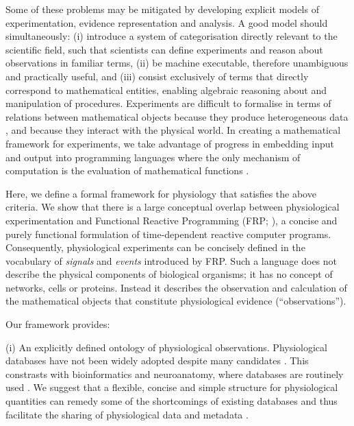 Some of these problems may be mitigated by developing explicit models
of experimentation, evidence representation and analysis. A good model
should simultaneously: (i) introduce a system of categorisation
directly relevant to the scientific field, such that scientists can
define experiments and reason about observations in familiar terms,
(ii) be machine executable, therefore unambiguous and practically
useful, and (iii) consist exclusively of terms that directly
correspond to mathematical entities, enabling algebraic reasoning
about and manipulation of procedures.  Experiments are difficult to
formalise in terms of relations between mathematical objects because
they produce heterogeneous data \citep{Tukey1962}, and because they
interact with the physical world. In creating a mathematical framework
for experiments, we take advantage of progress in embedding input and
output \citep{PeytonJones2002, Wadler1995} into programming languages
where the only mechanism of computation is the evaluation of
mathematical functions \citep{Church1941}.

Here, we define a formal framework for physiology
that satisfies the above criteria. We show that there
is a large conceptual overlap between physiological experimentation
and Functional Reactive Programming (FRP; \citep{Elliott1997,
  Nilsson2002}), a concise and purely functional formulation of
time-dependent reactive computer programs. Consequently, physiological
experiments can be concisely defined in the vocabulary of
\emph{signals} and \emph{events} introduced by FRP. Such a language
does not describe the physical components of biological organisms; it
has no concept of networks, cells or proteins. Instead it describes
the observation and calculation of the mathematical objects that
constitute physiological evidence (``observations'').

Our framework provides:

(i) An explicitly defined ontology of physiological
observations. Physiological databases have not been widely adopted
\citep{Herz2008, Amari2002} despite many candidates \citep{Jessop2010,
  Teeters2008, Frishkoff2009, Katz2010}.  This constrasts with
bioinformatics and neuroanatomy, where databases are routinely used
\citep{Rodriguez-Tome1996, Ascoli2007}. We suggest that a flexible,
concise and simple structure for physiological quantities can remedy
some of the shortcomings \citep{Gardner2005, Amari2002} of existing
databases and thus facilitate the sharing of physiological data and
metadata \citep{Insel2003}.

